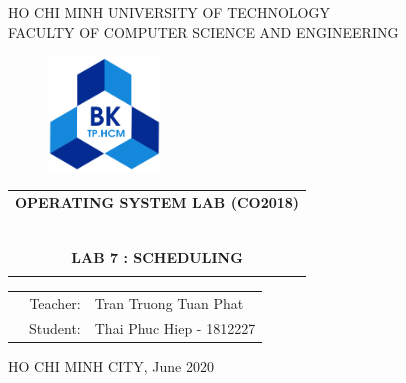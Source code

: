 \documentclass[a4paper]{article}
\begin{document}
\begin{titlepage}
\begin{center}
HO CHI MINH UNIVERSITY OF TECHNOLOGY \\
FACULTY OF COMPUTER SCIENCE AND ENGINEERING 
\end{center}

\vspace{1cm}

\begin{figure}[h!]
\begin{center}
\includegraphics[width=3cm]{hcmut.png}
\end{center}
\end{figure}

\vspace{1cm}


\begin{center}
\begin{tabular}{c}
\multicolumn{1}{c}{\textbf{{\Large OPERATING SYSTEM LAB (CO2018)}}}\\
~~\\
\hline
\\
\textbf{{\Huge LAB 7 : SCHEDULING}}\\
\\
\hline
\end{tabular}
\end{center}

\vspace{3cm}

\begin{table}[h]
\begin{tabular}{rrl}
\hspace{5 cm} & Teacher: & Tran Truong Tuan Phat\\
& Student: & Thai Phuc Hiep - 1812227 \\
\end{tabular}
\end{table}

\vspace{4.7cm}

\begin{center}
{\footnotesize HO CHI MINH CITY, June 2020}
\end{center}
\end{titlepage}
\end{document}
